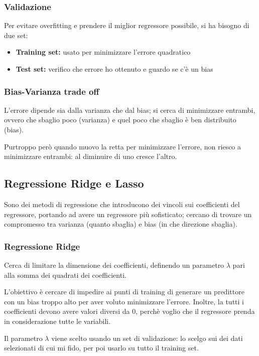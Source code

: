 \documentclass{report}
\begin{document}
\subsubsection{Validazione}
Per evitare overfitting e prendere il miglior regressore possibile, si ha bisogno di due set:
\begin{itemize}
    \item \textbf{Training set:} usato per minimizzare l'errore quadratico 
    \item \textbf{Test set:} verifico che errore ho ottenuto e guardo se c'è un bias
\end{itemize}


\subsubsection{Bias-Varianza trade off}
L'errore dipende sia dalla varianza che dal bias; si cerca di minimizzare entrambi, ovvero che sbaglio poco (varianza) e quel poco 
che sbaglio è ben distribuito (bias).

\noindent Purtroppo però quando muovo la retta per minimizzare l'errore, non riesco a minimizzare entrambi: al diminuire di uno cresce l'altro.

\subsection{Regressione Ridge e Lasso}

Sono dei metodi di regressione che introducono dei vincoli sui coefficienti del regressore, portando ad avere un regressore 
più sofisticato; cercano di trovare un compromesso tra varianza (quanto sbaglia) e bias (in che direzione sbaglia).

\subsubsection{Regressione Ridge}
Cerca di limitare la dimensione dei coefficienti, definendo un parametro $\lambda$ pari alla somma dei quadrati dei coefficienti.

\noindent L'obiettivo è cercare di impedire ai punti di training di generare un predittore con un bias troppo alto per aver voluto 
minimizzare l'errore. Inoltre, la tutti i coefficienti devono avere valori diversi da 0, perchè voglio che il regressore prenda in 
considerazione tutte le variabili.

\noindent Il parametro $\lambda$ viene scelto usando un set di validazione: lo scelgo sui dei dati selezionati di cui mi fido, per poi 
usarlo su tutto il training set.
\end{document}
